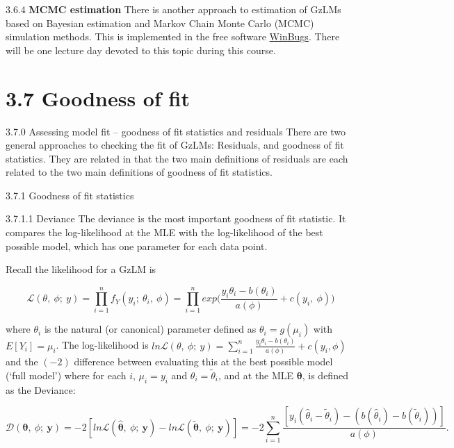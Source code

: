 \documentclass[
  9pt,
  ignorenonframetext,
]{beamer}
\begin{document}
\begin{frame}{3.6.4 \textbf{MCMC estimation}}
\protect\hypertarget{mcmc-estimation}{}
There is another approach to estimation of GzLMs based on Bayesian
estimation and Markov Chain Monte Carlo (MCMC) simulation methods. This
is implemented in the free software
\href{http://www.mrc-bsu.cam.ac.uk/bugs/}{WinBugs}. There will be one
lecture day devoted to this topic during this course.
\end{frame}

\hypertarget{goodness-of-fit}{%
\section{3.7 Goodness of fit}\label{goodness-of-fit}}

\begin{frame}{3.7.0 Assessing model fit -- goodness of fit statistics
and residuals}
\protect\hypertarget{assessing-model-fit-goodness-of-fit-statistics-and-residuals}{}
There are two general approaches to checking the fit of GzLMs:
Residuals, and goodness of fit statistics. They are related in that the
two main definitions of residuals are each related to the two main
definitions of goodness of fit statistics.
\end{frame}

\begin{frame}{3.7.1 Goodness of fit statistics}
\protect\hypertarget{goodness-of-fit-statistics}{}
\begin{block}{3.7.1.1 Deviance}
\protect\hypertarget{deviance}{}
The deviance is the most important goodness of fit statistic. It
compares the log-likelihood at the MLE with the log-likelihood of the
best possible model, which has one parameter for each data point.

Recall the likelihood for a GzLM is

\[
\mathcal L(\theta,\ \phi;\ y)=\prod_{i=1}^n f_Y (y_i;\ \theta_i,\ \phi) =\prod_{i=1}^n exp \Bigg(\frac {y_i \theta_i-b(\theta_i)} {a(\phi)} + c(y_i,\ \phi)\Bigg) 
\]

where \(\theta_i\) is the natural (or canonical) parameter defined as
\(\theta_i=g(\mu_i)\) with \(E[Y_i]=\mu_i\). The log-likelihood is
\(ln \mathcal L(\theta,\ \phi;\ y)=\sum_{i=1}^n \frac {y_i \theta_i-b(\theta_i)} {a(\phi)}+c(y_i,\phi)\)
and the \((-2)\) difference between evaluating this at the best possible
model (`full model') where for each \(i\), \(\mu_i=y_i\) and
\(\theta_i=\tilde \theta_i\), and at the MLE \(\pmb \theta\), is defined
as the Deviance:

\[
\mathcal D(\pmb \theta,\ \phi;\ \pmb y)=-2[ln \mathcal L(\pmb {\hat \theta},\ \phi;\ \pmb y) - ln \mathcal L(\pmb {\tilde \theta},\ \phi;\ \pmb y)] = -2\sum_{i=1}^n \frac {[y_i ({ \hat \theta} _i- \tilde \theta_i)-(b(\hat \theta_i)-b(\tilde \theta _i))]} {a(\phi)}.
\]
\end{block}
\end{frame}
\end{document}
